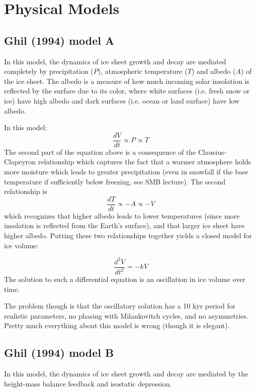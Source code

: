 \documentclass[12pt]{article}
\theoremstyle{definition}
\begin{document}
\section{Physical Models}

\subsection{Ghil (1994) model A}
In this model, the dynamics of ice sheet growth and decay are mediated completely by precipitation ($P$), atmospheric temperature ($T$) and albedo ($A$) of the ice sheet. The albedo is a measure of how much incoming solar insolation is reflected by the surface due to its color, where white surfaces (i.e. fresh snow or ice) have high albedo and dark surfaces (i.e. ocean or land surface) have low albedo.

In this model:
\begin{equation}
\frac{dV}{dt} \propto P \propto T
\end{equation}
The second part of the equation above is a consequence of the Clausius-Clapeyron relationship which captures the fact that a warmer atmosphere holds more moisture which leads to greater precipitation (even in snowfall if the base temperature if sufficiently below freezing, see SMB lecture). The second relationship is
\begin{equation}
\frac{dT}{dt} \propto -A \propto -V
\end{equation}
which recognizes that higher albedo leads to lower temperatures (since more insolation is reflected from the Earth's surface), and that larger ice sheet have higher albedo. Putting these two relationships together yields a closed model for ice volume:
\begin{shaded}
\begin{equation}
\frac{d^2V}{dt^2} = -k V
\end{equation}
The solution to such a differential equation is an oscillation in ice volume over time.
\end{shaded}
The problem though is that the oscillatory solution has a 10 kyr period for realistic parameters, no phasing with Milankovitch cycles, and no asymmetries. Pretty much everything about this model is wrong (though it is elegant).

\subsection{Ghil (1994) model B} 
In this model, the dynamics of ice sheet growth and decay are mediated by the height-mass balance feedback and isostatic depression.
\end{document}
